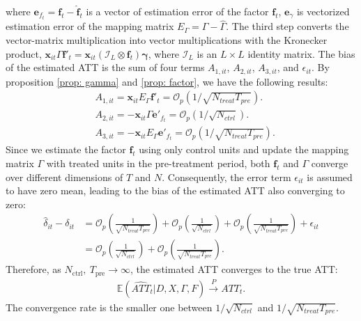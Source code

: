 \documentclass[12pt]{article}
\begin{document}
\noindent where $\bm{e}_{f_t} = \bm{f}_t - \hat{\bm{f}}_t$ is a vector of estimation error of the factor $\bm{f}_t$, $\bm{e}_{\gamma}$ is vectorized estimation error of the mapping matrix $E_{\Gamma} = \Gamma - \hat{\Gamma}$. The third step converts the vector-matrix multiplication into vector multiplications with the Kronecker product, $\bm{x}_{it}\Gamma\bm{f}'_t = \bm{x}_{it}(\mathcal{I}_L \otimes \bm{f}_t)\bm{\gamma}$, where $\mathcal{I}_L$ is an $L \times L$ identity matrix. The bias of the estimated ATT is the sum of four terms $A_{1,it}$, $A_{2,it}$, $A_{3,it}$, and $\epsilon_{it}$. By proposition \ref{prop: gamma} and \ref{prop: factor}, we have the following results:
\begin{equation*}
\begin{aligned}
    &A_{1,it} = \bm{x}_{it}E_{\Gamma}\bm{f}'_t = \mathcal{O}_p\left(1/\sqrt{N_{treat}T_{pre}}\right). \\
    &A_{2,it} = -\bm{x}_{it}\Gamma \bm{e}'_{f_t} = \mathcal{O}_p\left(1/\sqrt{N_{ctrl}}\right). \\
    &A_{3,it} = -\bm{x}_{it}E_{\Gamma}\bm{e}'_{f_t} = \mathcal{O}_p\left(1/\sqrt{N_{treat}T_{pre}}\right).
\end{aligned}
\end{equation*}
Since we estimate the factor $\bm{f}_t$ using only control units and update the mapping matrix $\Gamma$ with treated units in the pre-treatment period, both $\bm{f}_t$ and $\Gamma$ converge over different dimensions of $T$ and $N$. Consequently, the error term $\epsilon_{it}$ is assumed to have zero mean, leading to the bias of the estimated ATT also converging to zero:
\begin{equation*}
\begin{aligned}
    \hat{\delta}_{it} - \delta_{it} &= \mathcal{O}_p\left(\frac{1}{\sqrt{N_{treat}T_{pre}}}\right) + \mathcal{O}_p\left(\frac{1}{\sqrt{N_{ctrl}}}\right) + \mathcal{O}_p\left(\frac{1}{\sqrt{N_{treat}T_{pre}}}\right) + \epsilon_{it} \\
    &= \mathcal{O}_p\left(\frac{1}{\sqrt{N_{ctrl}}} \right) + \mathcal{O}_p\left(\frac{1}{\sqrt{N_{treat}T_{pre}}} \right).
\end{aligned}
\end{equation*}
Therefore, as $N_{\text{ctrl}}, \ T_{\text{pre}} \to \infty$, the estimated ATT converges to the true ATT:
\begin{equation*}
\begin{aligned}
    \mathbb{E}\left(\widehat{ATT}_{t} | D, X, \Gamma, F\right) \xrightarrow{P} ATT_{t}.
\end{aligned}
\end{equation*}
The convergence rate is the smaller one between $1/\sqrt{N_{ctrl}}$ and $1/\sqrt{N_{treat}T_{pre}}$.
\end{document}
